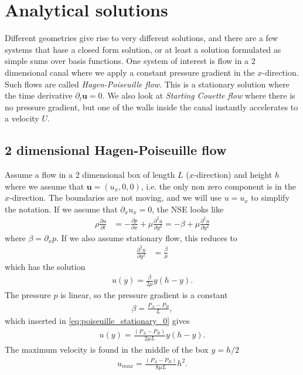 \documentclass[a4paper,10pt]{article}
\renewcommand{\vec}[1]{\mathbf{#1}}
\renewcommand{\(}{\left(}
\renewcommand{\)}{\right)}
\newcommand{\dpart}[2]{\frac{\partial#1}{\partial#2}}
\newcommand{\dpartt}[2]{\frac{\partial^2#1}{\partial#2^2}}
\begin{document}
\section{Analytical solutions}
Different geometries give rise to very different solutions, and there are a few systems that hase a closed form solution, or at least a solution formulated as simple sums over basis functions. One system of interest is flow in a 2 dimensional canal where we apply a constant pressure gradient in the $x$-direction. Such flows are called \textit{Hagen-Poiseuille flow}. This is a stationary solution where the time derivative $\partial_t \vec u=0$. We also look at \textit{Starting Couette flow} where there is no pressure gradient, but one of the walls inside the canal instantly accelerates to a velocity $U$.

\subsection{2 dimensional Hagen-Poiseuille flow}
\label{sec:hagenpoiseuille}
Assume a flow in a 2 dimensional box of length $L$ ($x$-direction) and height $h$ where we assume that $\vec u = (u_x,0,0)$, i.e. the only non zero component is in the $x$-direction. The boundaries are not moving, and we will use $u=u_x$ to simplify the notation. If we assume that $\partial_x u_x=0$, the NSE looks like
\begin{align*}
  \rho\dpart{u}{t} &= -\dpart{p}{x} + \mu\dpartt{u}{y} = -\beta + \mu\dpartt{u}{y}
\end{align*}
where $\beta = \partial_x p$. If we also assume stationary flow, this reduces to
\begin{align*}
  \dpartt{u}{y} &= \frac{\beta}{\mu}
\end{align*}
which has the solution
\begin{align}
  \label{eq:poiseuille_stationary_0}
  u(y) = \frac{\beta}{2\mu}y(h-y).
\end{align}
The pressure $p$ is linear, so the pressure gradient is a constant
\begin{align*}
  \beta = \frac{P_A-P_B}{L},
\end{align*}
which inserted in \eqref{eq:poiseuille_stationary_0} gives
\begin{align}
  \label{eq:poiseuille_stationary_full}
  u(y) = \frac{(P_A-P_B)}{2\mu L}y(h-y).
\end{align}
The maximum velocity is found in the middle of the box $y=h/2$
\begin{align}
  \label{eq:poiseuille_stationary}
  u_{max} = \frac{(P_A-P_B)}{8\mu L}h^2.
\end{align}
\end{document}
